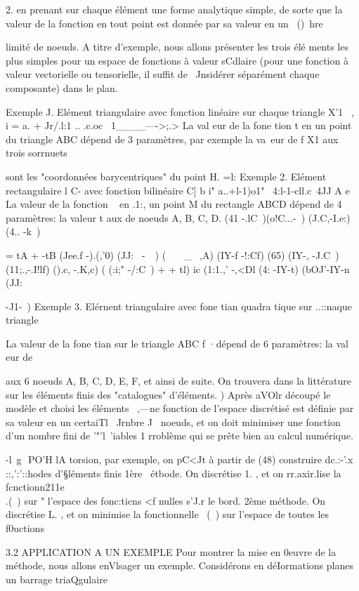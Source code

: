 {{{{{{2. 
en prenant sur chaque élément une forme analytique simple, de sorte que la valeur de la fonction en tout point est donnée par sa valeur en un ~()~hre 


limité de noeuds. A titre d'exemple, nous allons présenter les trois élé­
ments  les  plus simples  pour  un  espace  de  fonctions  à  valeur sCdlaire  (pour  
une  fonction  à  valeur vectorielle  ou  tensorielle,  il  suffit de  ~Jnsidérer  
séparément chaque composante)  dans  le plan.  

Exemple J. Elément triangulaire avec fonction linéaire sur chaque triangle 
X'1 ~,
i = a. + Jr/.l:1 .. .c.oc~ 
1____---->;.> 
La val eur de la fone tion t en un point du triangle ABC dépend de 3 paramètres, par exemple la va~eur de f X1 aux trois sorrnuets 


sont les "coordonnées barycentriques" du point H. 
=l: 
Exemple 2. Elément rectangulaire l 
C-
avec fonction bilinéaire 
C] b 
i" a..+l-1)o1" ~4:l-1-cll.c~4JJ 
A e 
La valeur de la fonction ~ en 
.1:, 
un point M du rectangle ABCD dépend de 4 paramètres: la valeur t aux
de 
noeuds A, B, C, D. 
(41 -.lC~)(o!C...-~) (J.C,-I.e:) (4.. -k~)
{ = tA + -tB
(Jee.f -).(,'0) (JJ:~ -~~) (~~~ _ ~,A) (IY-f -!:Cf) 
(65) 
(IY-, -J.C~) (11;.,-.I!lf) ().c, -.K,c) ( (:i;" -/:C~)
+ + tl)
ic (1:1.,' -,<Dl (4: -IY-t) (bOJ'-IY-n (JJ:{-J1-~) 
Exemple 3. Elérnent triangulaire avec fone tian quadra tique sur ..::naque trian­gle 

La valeur de la fone tian sur le triangle ABC
f 
·dépend de 6 paramètres: la val eur de { aux 6 
noeuds A, B, C, D, E, F, et ainsi de suite. On 
trouvera dans la littérature sur les éléments 
finis des "catalogues" d'éléments. 
) 
Après aVOlr découpé le modèle et choisi les éléments~ ,---ne fonction de l'espace discrétisé est définie par sa valeur en un certaiTl ~Jrnbre J~ noeuds, et on doit minimiser une fonction d'un nombre fini de '"'l~'iables 1 rro­blème qui se prête bien au calcul numérique. 

-l~g ­
PO'H lA torsion, par exemple, on pC<Jt à partir de (48) construire dc.:-'.x ::,':'::hodes d'§léments finis 1ère ~étbode. On discrétise 1. , et on rr.axir.lise la fcnctionn211e \\.(~) sur 
"­
l'espace des fonc:ticns <f nulles s'J.r le bord. 
2ème méthode. On discrétise L. , et on minimise la fonctionnelle ~(~) sur 
l'espace de toutes les f0uctions ~ 

3.2 APPLICATION A UN EXEMPLE 
Pour montrer la mise en 0euvre de la méthode, nous allons enVlsa­ger un exemple. Considérons en déIormations planes un barrage triaQgulaire 

}}}}}}}}}
